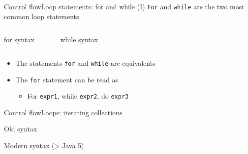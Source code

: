 \documentclass[10pt,compress]{beamer} %
\begin{document}
\begin{frame}{Control flow}{Loop statements: for and while (I)}
	\texttt{For} and \texttt{while} are the two most common loop statements
	\vspace{-0.2cm}
    \begin{columns}
	\footnotesize{
		\begin{block}{for syntax}
		\vspace{-0.2cm}
		
		\vspace{-0.2cm}
		\end{block}
	}	
		\Large{=}
	\footnotesize{
		\begin{block}{while syntax}
		\vspace{-0.2cm}
		
		\vspace{-0.2cm}
		\end{block}
	}
	\end{columns}

	\begin{itemize}
	\item The statements \texttt{for} and \texttt{while} are equivalents
	\item The \texttt{for} statement can be read as
		\begin{itemize}
		\item For \texttt{expr1}, while \texttt{expr2}, do \texttt{expr3}
		\end{itemize}
    \end{itemize}
\end{frame}

\begin{frame}{Control flow}{Loops: iterating collections}
	\vspace{-0.2cm}
	\begin{block}{Old syntax}
	\vspace{-0.2cm}
	
	\vspace{-0.2cm}
	\end{block}

	\vspace{-0.2cm}
    \begin{block}{Modern syntax (> Java 5)}
	\vspace{-0.2cm}
	
	\vspace{-0.2cm}
	\end{block}
\end{frame}
\end{document}
